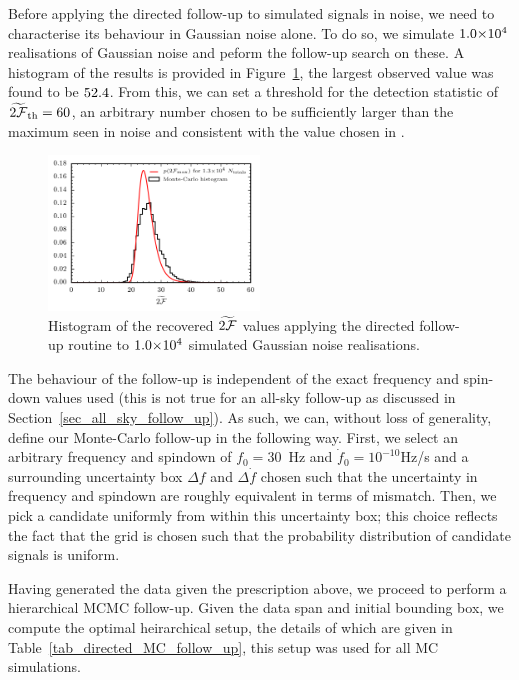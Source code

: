 \documentclass[aps, prd, twocolumn, superscriptaddress, floatfix, showpacs, nofootinbib, longbibliography]{revtex4-1}
\begin{document}
Before applying the directed follow-up to simulated signals in noise, we need
to characterise its behaviour in Gaussian noise alone. To do so, we simulate
$1.0{\times}10^{4}$ realisations of Gaussian noise and peform the follow-up
search on these. A histogram of the results is provided in
Figure~\ref{fig_hist_DirectedMCNoiseOnly}, the largest observed value was
found to be $52.4$. From this, we can set a threshold
for the detection statistic of $\widetilde{2{\mathcal{F}}}_{\rm th} = 60$, an arbitrary
number chosen to be sufficiently larger than the maximum seen in noise and
consistent with the value chosen in \citet{shaltev2013}.
\begin{figure}[htb]
\centering
\includegraphics[width=0.5\textwidth]{directed_noise_twoF_histogram}
\caption{Histogram of the recovered $\widetilde{2{\mathcal{F}}}$ values applying the
directed follow-up routine to $1.0{\times}10^{4}$ simulated Gaussian noise
realisations.}
\label{fig_hist_DirectedMCNoiseOnly}
\end{figure}

The behaviour of the follow-up is independent of the exact frequency and
spin-down values used (this is not true for an all-sky follow-up as discussed
in Section~\ref{sec_all_sky_follow_up}). As such, we can, without loss of
generality, define our Monte-Carlo follow-up in the following way. First, we
select an arbitrary frequency and spindown of $f_0=30$~Hz and
$\dot{f}_0=10^{-10}$Hz/s and a surrounding uncertainty box $\Delta f$ and
$\Delta \dot{f}$ chosen such that the uncertainty in frequency and spindown are
roughly equivalent in terms of mismatch. Then, we pick a candidate uniformly
from within this uncertainty box; this choice reflects the fact that the grid
is chosen such that the probability distribution of candidate signals is
uniform.

Having generated the data given the prescription above, we proceed to perform a
hierarchical MCMC follow-up. Given the data span and initial bounding box, we
compute the optimal heirarchical setup, the details of which are given in
Table~\ref{tab_directed_MC_follow_up}, this setup was used for all MC
simulations.
\end{document}
